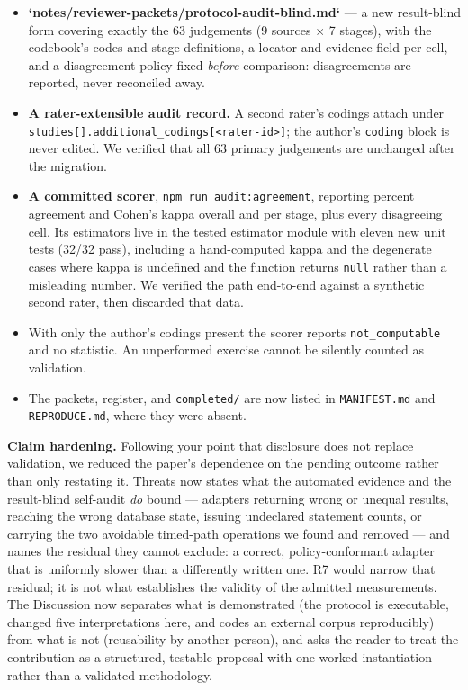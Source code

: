 \documentclass[11pt,a4paper]{article}
\begin{document}
\begin{itemize}
  \item \textbf{`notes/reviewer-packets/protocol-audit-blind.md`} --- a new result-blind form covering exactly the 63 judgements (9 sources $\times$ 7 stages), with the codebook's codes and stage definitions, a locator and evidence field per cell, and a disagreement policy fixed \emph{before} comparison: disagreements are reported, never reconciled away.
  \item \textbf{A rater-extensible audit record.} A second rater's codings attach under \texttt{studies[].additional\_codings[<rater-id>]}; the author's \texttt{coding} block is never edited. We verified that all 63 primary judgements are unchanged after the migration.
  \item \textbf{A committed scorer}, \texttt{npm run audit:agreement}, reporting percent agreement and Cohen's kappa overall and per stage, plus every disagreeing cell. Its estimators live in the tested estimator module with eleven new unit tests (32/32 pass), including a hand-computed kappa and the degenerate cases where kappa is undefined and the function returns \texttt{null} rather than a misleading number. We verified the path end-to-end against a synthetic second rater, then discarded that data.
  \item With only the author's codings present the scorer reports \texttt{not\_computable} and no statistic. An unperformed exercise cannot be silently counted as validation.
  \item The packets, register, and \texttt{completed/} are now listed in \texttt{MANIFEST.md} and \texttt{REPRODUCE.md}, where they were absent.
\end{itemize}

\textbf{Claim hardening.} Following your point that disclosure does not replace validation, we reduced the paper's dependence on the pending outcome rather than only restating it. Threats now states what the automated evidence and the result-blind self-audit \emph{do} bound --- adapters returning wrong or unequal results, reaching the wrong database state, issuing undeclared statement counts, or carrying the two avoidable timed-path operations we found and removed --- and names the residual they cannot exclude: a correct, policy-conformant adapter that is uniformly slower than a differently written one. R7 would narrow that residual; it is not what establishes the validity of the admitted measurements. The Discussion now separates what is demonstrated (the protocol is executable, changed five interpretations here, and codes an external corpus reproducibly) from what is not (reusability by another person), and asks the reader to treat the contribution as a structured, testable proposal with one worked instantiation rather than a validated methodology.
\end{document}
